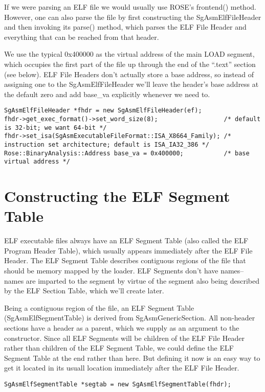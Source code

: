 If we were parsing an ELF file we would usually use ROSE's frontend()
method. However, one can also parse the file by first constructing the
SgAsmElfFileHeader and then invoking its parse() method, which parses
the ELF File Header and everything that can be reached from that
header.

We use the typical 0x400000 as the virtual address of the main LOAD
segment, which occupies the first part of the file up through the end
of the ``.text'' section (see below). ELF File Headers don't actually
store a base address, so instead of assigning one to the
SgAsmElfFileHeader we'll leave the header's base address at the
default zero and add base\_va explicitly whenever we need to.

\begin{verbatim}
SgAsmElfFileHeader *fhdr = new SgAsmElfFileHeader(ef);
fhdr->get_exec_format()->set_word_size(8);                  /* default is 32-bit; we want 64-bit */
fhdr->set_isa(SgAsmExecutableFileFormat::ISA_X8664_Family); /* instruction set architecture; default is ISA_IA32_386 */
Rose::BinaryAnalysis::Address base_va = 0x400000;           /* base virtual address */
\end{verbatim}

\section{Constructing the ELF Segment Table}

ELF executable files always have an ELF Segment Table (also called the
ELF Program Header Table), which usually appears immediately after the
ELF File Header. The ELF Segment Table describes contiguous regions of
the file that should be memory mapped by the loader. ELF Segments
don't have names--names are imparted to the segment by virtue of the
segment also being described by the ELF Section Table, which we'll
create later.

Being a contiguous region of the file, an ELF Segment Table
(SgAsmElfSegmentTable) is derived from SgAsmGenericSection. All
non-header sections have a header as a parent, which we supply as an
argument to the constructor. Since all ELF Segments will be children of
the ELF File Header rather than children of the ELF Segment Table, we
could define the ELF Segment Table at the end rather than here. But
defining it now is an easy way to get it located in its usuall
location immediately after the ELF File Header.

\begin{verbatim}
SgAsmElfSegmentTable *segtab = new SgAsmElfSegmentTable(fhdr);
\end{verbatim}

